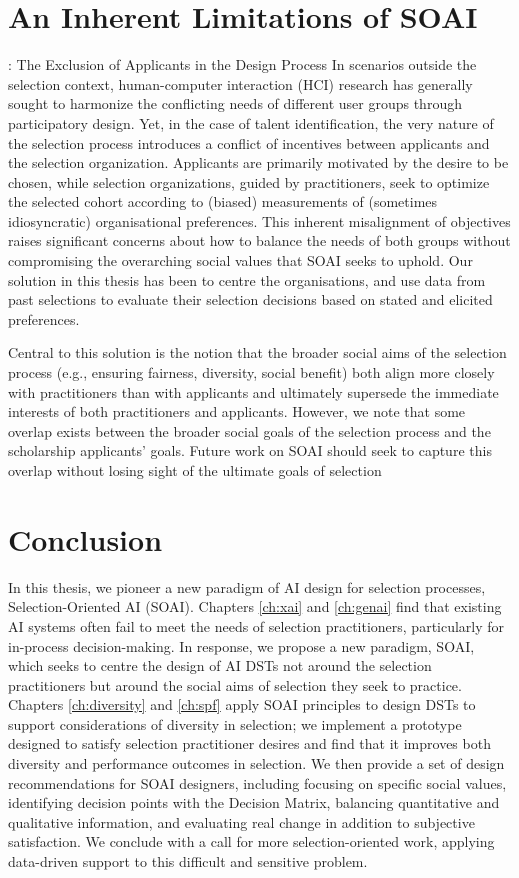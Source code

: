 \section{An Inherent Limitations of SOAI}: The Exclusion of Applicants in the Design Process
In scenarios outside the selection context, human-computer interaction (HCI) research has generally sought to harmonize the conflicting needs of different user groups through participatory design. Yet, in the case of talent identification, the very nature of the selection process introduces a conflict of incentives between applicants and the selection organization. Applicants are primarily motivated by the desire to be chosen, while selection organizations, guided by practitioners, seek to optimize the selected cohort according to (biased) measurements of (sometimes idiosyncratic) organisational preferences. This inherent misalignment of objectives raises significant concerns about how to balance the needs of both groups without compromising the overarching social values that SOAI seeks to uphold. Our solution in this thesis has been to centre the organisations, and use data from past selections to evaluate their selection decisions based on stated and elicited preferences. %

Central to this solution is the notion that the broader social aims of the selection process (e.g., ensuring fairness, diversity, social benefit) both align more closely with practitioners than with applicants and ultimately supersede the immediate interests of both practitioners and applicants. However, we note that some overlap exists between the broader social goals of the selection process and the scholarship applicants' goals. Future work on SOAI should seek to capture this overlap without losing sight of the ultimate goals of selection 

\section{Conclusion}
In this thesis, we pioneer a new paradigm of AI design for selection processes, Selection-Oriented AI (SOAI). Chapters \ref{ch:xai} and \ref{ch:genai} find that existing AI systems often fail to meet the needs of selection practitioners, particularly for in-process decision-making. In response, we propose a new paradigm, SOAI, which seeks to centre the design of AI DSTs not around the selection practitioners but around the social aims of selection they seek to practice. Chapters \ref{ch:diversity} and \ref{ch:spf} apply SOAI principles to design DSTs to support considerations of diversity in selection; we implement a prototype designed to satisfy selection practitioner desires and find that it improves both diversity and performance outcomes in selection. We then provide a set of design recommendations for SOAI designers, including focusing on specific social values, identifying decision points with the Decision Matrix, balancing quantitative and qualitative information, and evaluating real change in addition to subjective satisfaction. We conclude with a call for more selection-oriented work, applying data-driven support to this difficult and sensitive problem.